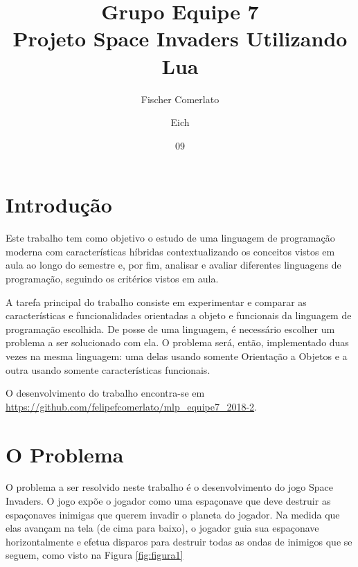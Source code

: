 \documentclass[rel_mlp]{iiufrgs}
\title{Grupo Equipe 7 \\ Projeto Space Invaders Utilizando Lua}
\author{Fischer Comerlato}{Felipe} %
\author{Eich}{Leonardo} %
\date{09}{2018}
\begin{document}
\maketitle      


\tableofcontents








%
\chapter{Introdução} \label{intro}

Este trabalho tem como objetivo o estudo de uma linguagem de programação moderna com características híbridas contextualizando os conceitos vistos em aula ao longo do semestre e, por fim, analisar e avaliar diferentes linguagens de programação, seguindo os critérios vistos em aula.

A tarefa principal do trabalho consiste em experimentar e comparar as características e funcionalidades orientadas a objeto e funcionais da linguagem de programação escolhida. De posse de uma linguagem, é necessário escolher um problema a ser solucionado com ela. O problema será, então, implementado duas vezes na mesma linguagem: uma delas usando somente Orientação a Objetos e a outra usando somente características funcionais.

O desenvolvimento do trabalho encontra-se em \url{https://github.com/felipefcomerlato/mlp_equipe7_2018-2}.


\chapter{O Problema}
O problema a ser resolvido neste trabalho é o desenvolvimento do jogo Space Invaders. O jogo expõe o jogador como uma espaçonave que deve destruir as espaçonaves inimigas que querem invadir o planeta do jogador. Na medida que elas avançam na tela (de cima para baixo), o jogador guia sua espaçonave horizontalmente e efetua disparos para destruir todas as ondas de inimigos que se seguem, como visto na Figura \ref{fig:figura1}
\end{document}
